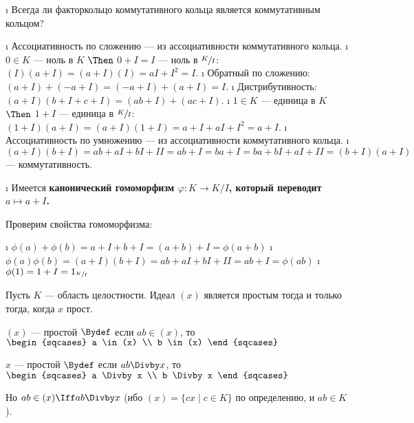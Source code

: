 \begin{enumerate}
\def\labelenumi{\alph{enumi})}
\tightlist
\i
  Всегда ли факторкольцо коммутативного кольца является коммутативным кольцом?
  \begin{solution}

  \begin{itemize}
  \tightlist
  \i
    Ассоциативность по сложению --- из ассоциативности коммутативного кольца.
  \i
    \(0 \in K\) --- ноль в \(K\) \(\Then\) \(0+I=I\) --- ноль в \(\sfrac{K}{I}\): \((I)(a+I) = (a+I)(I) = aI+I^2 = I\).
  \i
    Обратный по сложению: \((a+I)+(-a+I) = (-a+I)+(a+I) = I\).
  \i
    Дистрибутивность: \((a+I)(b+I+c+I) = (ab+I)+(ac+I)\).
  \i
    \(1 \in K\) --- единица в \(K\) \(\Then\) \(1+I\) --- единица в \(\sfrac{K}{I}\): \((1+I)(a+I) = (a+I)(1+I) = a+I+aI+I^2 = a+I\).
  \i
    Ассоциативность по умножению --- из ассоциативности коммутативного кольца.
  \i
    \((a+I)(b+I) = ab+aI+bI+II=ab+I=ba+I=ba+bI+aI+II=(b+I)(a+I)\) --- коммутативность.
  \end{itemize}

  \end{solution}
\i
  Имеется \bf{канонический} гомоморфизм \(\varphi: K \to K/I\), который переводит \(a \mapsto a+I\).
  \begin{solution}
  Проверим свойства гомоморфизма:

  \begin{itemize}
  \tightlist
  \i
    \(\phi(a)+\phi(b)=a+I+b+I= (a+b)+I=\phi(a+b)\)
  \i
    \(\phi(a)\phi(b) = (a+I)(b+I) = ab+aI+bI+II = ab+I = \phi(ab)\)
  \i
    \(\phi(1) = 1+I = 1_{\sfrac{K}{I}}\)
  \end{itemize}

  \end{solution}
\end{enumerate}

\begin{problem}[20(4.5)]
Пусть $K$ --- область целостности. Идеал $(x)$ является простым тогда и только тогда, когда $x$ прост.
\end{problem}
\begin{solution}
\((x)\) --- простой \(\Bydef\) если \(ab \in (x)\), то \(\begin{sqcases} a \in (x) \\ b \in (x) \end{sqcases}\)

\(x\) --- простой \(\Bydef\) если \(ab \Divby x\), то \(\begin{sqcases} a \Divby x \\ b \Divby x \end{sqcases}\)

Но \(ab \in (x) \Iff ab \Divby x\) (ибо \((x) = \{cx \mid c \in K\}\) по определению, и \(ab \in K\)).
\end{solution}

